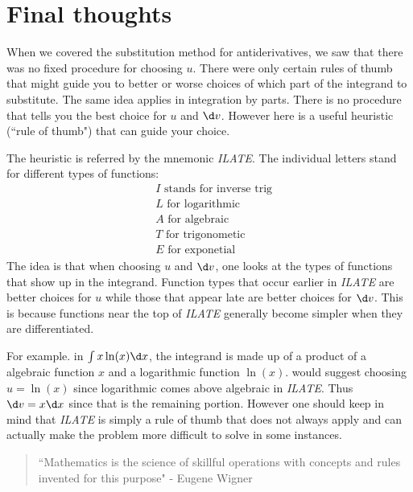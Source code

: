 \documentclass{ximera}
\begin{document}

\section{Final thoughts}
When we covered the substitution method for antiderivatives, we saw that there was no fixed procedure for choosing $u$. There were only certain rules of thumb that might guide you to better or worse choices of which part of the integrand to substitute. The same idea applies in integration by parts. There is no procedure that tells you the best choice for $u$ and $\d v$. However here is a useful heuristic (``rule of thumb") that can guide your choice. 

The heuristic is referred by the mnemonic \textit{ILATE}.  The individual letters stand for different types of functions: 
\begin{align}
&I \text{  stands for inverse trig} \\ 
&L \text{  for logarithmic} \\
&A \text{  for algebraic} \\
&T \text{  for trigonometic} \\
&E \text{  for exponetial}
\end{align}
The idea is that when choosing $u$ and $\d v$, one looks at the types of functions that show up in the integrand. Function types that occur earlier in \textit{ILATE} are better choices for $u$ while those that appear late are better choices for $\d v$. This is because functions near the top of  \textit{ILATE} generally become simpler when they are differentiated. 

For example. in $\int x \ln(x) \d x$, the integrand is made up of a product of a algebraic function $x$ and a logarithmic function $\ln(x)$.    would suggest choosing $u=\ln(x)$ since logarithmic comes above algebraic in \textit{ILATE}. Thus $\d v=x \d x$ since that is the remaining portion. However one should keep in mind that \textit{ILATE} is simply a rule of thumb that does not always apply and can actually make the problem more difficult to solve in some instances. 

\begin{quote}
``Mathematics is the science of skillful operations with concepts and rules invented for this purpose" - Eugene Wigner
\end{quote}
\end{document}
